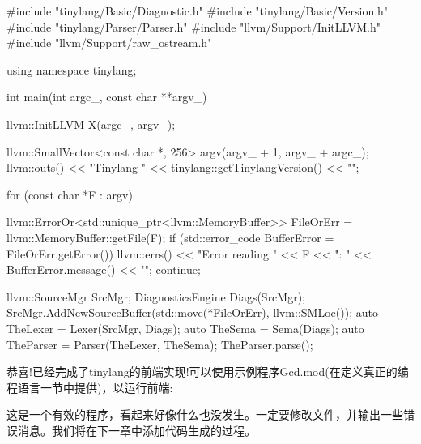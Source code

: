 \begin{cpp}
#include "tinylang/Basic/Diagnostic.h"
#include "tinylang/Basic/Version.h"
#include "tinylang/Parser/Parser.h"
#include "llvm/Support/InitLLVM.h"
#include "llvm/Support/raw_ostream.h"

using namespace tinylang;

int main(int argc_, const char **argv_) {
    llvm::InitLLVM X(argc_, argv_);

    llvm::SmallVector<const char *, 256> argv(argv_ + 1,
                                              argv_ + argc_);
    llvm::outs() << "Tinylang "
                 << tinylang::getTinylangVersion() << "\n";

    for (const char *F : argv) {
        llvm::ErrorOr<std::unique_ptr<llvm::MemoryBuffer>>
            FileOrErr = llvm::MemoryBuffer::getFile(F);
        if (std::error_code BufferError =
                FileOrErr.getError()) {
            llvm::errs() << "Error reading " << F << ": "
                         << BufferError.message() << "\n";
            continue;
        }

        llvm::SourceMgr SrcMgr;
        DiagnosticsEngine Diags(SrcMgr);
        SrcMgr.AddNewSourceBuffer(std::move(*FileOrErr),
                                  llvm::SMLoc());
        auto TheLexer = Lexer(SrcMgr, Diags);
        auto TheSema = Sema(Diags);
        auto TheParser = Parser(TheLexer, TheSema);
        TheParser.parse();
    }
}
\end{cpp}

恭喜!已经完成了tinylang的前端实现!可以使用示例程序Gcd.mod(在定义真正的编程语言一节中提供)，以运行前端:


这是一个有效的程序，看起来好像什么也没发生。一定要修改文件，并输出一些错误消息。我们将在下一章中添加代码生成的过程。





